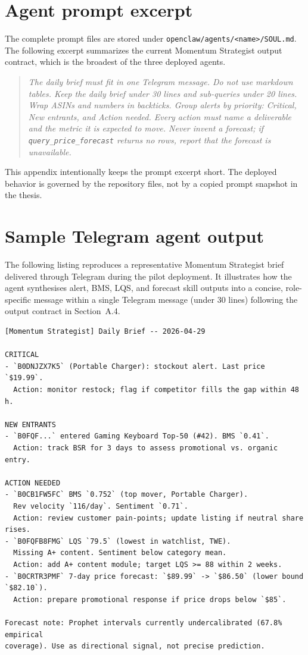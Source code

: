 \section{Agent prompt excerpt}

The complete prompt files are stored under \texttt{openclaw/agents/<name>/SOUL.md}. The following excerpt summarizes the current Momentum Strategist output contract, which is the broadest of the three deployed agents.

\begin{quote}\small
\itshape
The daily brief must fit in one Telegram message. Do not use markdown tables. Keep the daily brief under 30 lines and sub-queries under 20 lines. Wrap ASINs and numbers in backticks. Group alerts by priority: Critical, New entrants, and Action needed. Every action must name a deliverable and the metric it is expected to move. Never invent a forecast; if \texttt{query\_price\_forecast} returns no rows, report that the forecast is unavailable.
\end{quote}

This appendix intentionally keeps the prompt excerpt short. The deployed behavior is governed by the repository files, not by a copied prompt snapshot in the thesis.

\section{Sample Telegram agent output}
\label{app:telegram_sample}

The following listing reproduces a representative Momentum Strategist brief delivered through Telegram during the pilot deployment. It illustrates how the agent synthesises alert, BMS, LQS, and forecast skill outputs into a concise, role-specific message within a single Telegram message (under 30 lines) following the output contract in Section~A.4.

\begin{lstlisting}[breaklines=true, columns=flexible]
[Momentum Strategist] Daily Brief -- 2026-04-29

CRITICAL
- `B0DNJZX7K5` (Portable Charger): stockout alert. Last price `$19.99`.
  Action: monitor restock; flag if competitor fills the gap within 48 h.

NEW ENTRANTS
- `B0FQF...` entered Gaming Keyboard Top-50 (#42). BMS `0.41`.
  Action: track BSR for 3 days to assess promotional vs. organic entry.

ACTION NEEDED
- `B0CB1FW5FC` BMS `0.752` (top mover, Portable Charger).
  Rev velocity `116/day`. Sentiment `0.71`.
  Action: review customer pain-points; update listing if neutral share rises.
- `B0FQFB8FMG` LQS `79.5` (lowest in watchlist, TWE).
  Missing A+ content. Sentiment below category mean.
  Action: add A+ content module; target LQS >= 88 within 2 weeks.
- `B0CRTR3PMF` 7-day price forecast: `$89.99` -> `$86.50` (lower bound `$82.10`).
  Action: prepare promotional response if price drops below `$85`.

Forecast note: Prophet intervals currently undercalibrated (67.8% empirical
coverage). Use as directional signal, not precise prediction.
\end{lstlisting}

